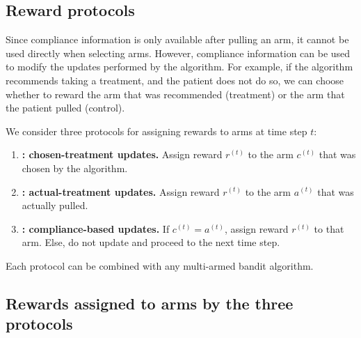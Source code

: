 \subsection{Reward protocols}
\label{sec:protocols}

Since compliance information is only available after pulling an arm, it cannot be used directly when selecting arms. However, compliance information can be used to modify the updates performed by the algorithm. For example, if the algorithm recommends taking a treatment, and the patient does not do so, we can choose whether to reward the arm that was recommended (treatment) or the arm that the patient pulled (control).

\begin{defn}\label{def:protocols}\eod
	We consider three protocols for assigning rewards to arms at time step $t$:
	\begin{enumerate}[P1.]
		\item \textbf{\chosen: chosen-treatment updates.}
		   Assign reward $r^{(t)}$ to the arm $c^{(t)}$ that was chosen by the algorithm.
		\item \textbf{\actual: actual-treatment updates.}
		   Assign reward $r^{(t)}$ to the arm $a^{(t)}$ that was actually pulled.
		\item \textbf{\comply: compliance-based updates.}
		   If $c^{(t)}=a^{(t)}$, assign reward $r^{(t)}$ to that arm. Else, do not update and proceed to the next time step.
	\end{enumerate}
\end{defn}
Each protocol can be combined with any multi-armed bandit algorithm. 

\subsection{Rewards assigned to arms by the three protocols}
\label{sec:protocol_table}

